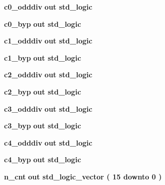 \begin{DoxyCompactItemize}
\item 
{\bf c0\+\_\+odddiv}  {\bfseries {\bfseries \textcolor{keywordflow}{out}\textcolor{vhdlchar}{ }}} {\bfseries \textcolor{comment}{std\+\_\+logic}\textcolor{vhdlchar}{ }} 
\item 
{\bf c0\+\_\+byp}  {\bfseries {\bfseries \textcolor{keywordflow}{out}\textcolor{vhdlchar}{ }}} {\bfseries \textcolor{comment}{std\+\_\+logic}\textcolor{vhdlchar}{ }} 
\item 
{\bf c1\+\_\+odddiv}  {\bfseries {\bfseries \textcolor{keywordflow}{out}\textcolor{vhdlchar}{ }}} {\bfseries \textcolor{comment}{std\+\_\+logic}\textcolor{vhdlchar}{ }} 
\item 
{\bf c1\+\_\+byp}  {\bfseries {\bfseries \textcolor{keywordflow}{out}\textcolor{vhdlchar}{ }}} {\bfseries \textcolor{comment}{std\+\_\+logic}\textcolor{vhdlchar}{ }} 
\item 
{\bf c2\+\_\+odddiv}  {\bfseries {\bfseries \textcolor{keywordflow}{out}\textcolor{vhdlchar}{ }}} {\bfseries \textcolor{comment}{std\+\_\+logic}\textcolor{vhdlchar}{ }} 
\item 
{\bf c2\+\_\+byp}  {\bfseries {\bfseries \textcolor{keywordflow}{out}\textcolor{vhdlchar}{ }}} {\bfseries \textcolor{comment}{std\+\_\+logic}\textcolor{vhdlchar}{ }} 
\item 
{\bf c3\+\_\+odddiv}  {\bfseries {\bfseries \textcolor{keywordflow}{out}\textcolor{vhdlchar}{ }}} {\bfseries \textcolor{comment}{std\+\_\+logic}\textcolor{vhdlchar}{ }} 
\item 
{\bf c3\+\_\+byp}  {\bfseries {\bfseries \textcolor{keywordflow}{out}\textcolor{vhdlchar}{ }}} {\bfseries \textcolor{comment}{std\+\_\+logic}\textcolor{vhdlchar}{ }} 
\item 
{\bf c4\+\_\+odddiv}  {\bfseries {\bfseries \textcolor{keywordflow}{out}\textcolor{vhdlchar}{ }}} {\bfseries \textcolor{comment}{std\+\_\+logic}\textcolor{vhdlchar}{ }} 
\item 
{\bf c4\+\_\+byp}  {\bfseries {\bfseries \textcolor{keywordflow}{out}\textcolor{vhdlchar}{ }}} {\bfseries \textcolor{comment}{std\+\_\+logic}\textcolor{vhdlchar}{ }} 
\item 
{\bf n\+\_\+cnt}  {\bfseries {\bfseries \textcolor{keywordflow}{out}\textcolor{vhdlchar}{ }}} {\bfseries \textcolor{comment}{std\+\_\+logic\+\_\+vector}\textcolor{vhdlchar}{ }\textcolor{vhdlchar}{(}\textcolor{vhdlchar}{ }\textcolor{vhdlchar}{ } \textcolor{vhdldigit}{15} \textcolor{vhdlchar}{ }\textcolor{keywordflow}{downto}\textcolor{vhdlchar}{ }\textcolor{vhdlchar}{ } \textcolor{vhdldigit}{0} \textcolor{vhdlchar}{ }\textcolor{vhdlchar}{)}\textcolor{vhdlchar}{ }} 

\end{DoxyCompactItemize}
